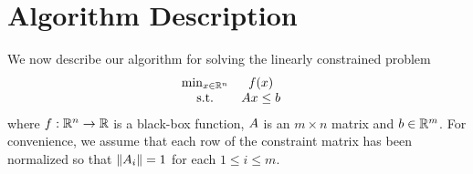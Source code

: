 \documentclass{article}
\begin{document}
%
%







\section{Algorithm Description}
\label{sec:linear}
We now describe our algorithm for solving the linearly constrained problem
\begin{align}
\label{eq:DFO-linear}
\begin{array}{ccl} \min_{x \in \mathbb R^n} & f(x) \\
\textrm{s.t.} & {A} x \le {b} & 
\end{array}
\end{align}
where $f:\mathbb R^n\rightarrow\mathbb R$ is a black-box function, 
${A}$ is an $m \times n$ matrix and ${b} \in \mathbb R^m$.
For convenience, we assume that each row of the constraint matrix has been normalized so that
$\left\|{A}_i\right\| = 1$ for each $1 \le i \le m$.
\end{document}

